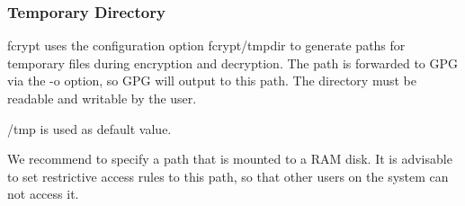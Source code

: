 \subsubsection*{Temporary Directory}

{\ttfamily fcrypt} uses the configuration option {\ttfamily fcrypt/tmpdir} to generate paths for temporary files during encryption and decryption. The path is forwarded to G\+PG via the {\ttfamily -\/o} option, so G\+PG will output to this path. The directory must be readable and writable by the user.

{\ttfamily /tmp} is used as default value.

We recommend to specify a path that is mounted to a R\+AM disk. It is advisable to set restrictive access rules to this path, so that other users on the system can not access it. 